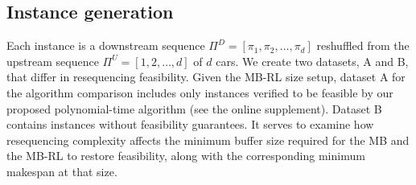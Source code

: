 \documentclass[12pt]{article}
\begin{document}
\subsection{Instance generation}\label{sec5-1}
Each instance is a downstream sequence $\Pi^{D}=[\pi_1,\pi_2,\dots,\pi_d]$ reshuffled from the upstream sequence $\Pi^{U}=[1,2,\dots,d]$ of $d$ cars. We create two datasets, A and B, that differ in resequencing feasibility. Given the MB-RL size setup, dataset A for the algorithm comparison includes only instances verified to be feasible by our proposed polynomial-time algorithm (see the online supplement). Dataset B contains instances without feasibility guarantees. It serves to examine how resequencing complexity affects the minimum buffer size required for the MB and the MB-RL to restore feasibility, along with the corresponding minimum makespan at that size.







\end{document}
